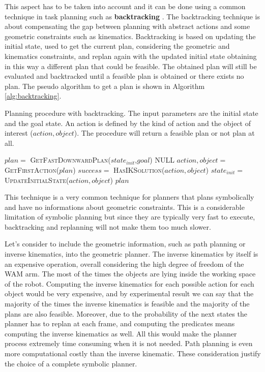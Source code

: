 This aspect has to be taken into account and it can be done using a common technique in task planning such as \textbf{backtracking} \citep{Bidot2015}. The backtracking technique is about compensating the gap between planning with abstract actions and some geometric constraints such as kinematics. Backtracking is based on updating the initial state, used to get the current plan, considering the geometric and kinematics constraints, and replan again with the updated initial state obtaining in this way a different plan that could be feasible. The obtained plan will still be evaluated and backtracked until a feasible plan is obtained or there exists no plan. The pseudo algorithm to get a plan is shown in Algorithm \ref{alg:backtracking}.

\begin{algorithm}
\caption{Planning procedure with backtracking. The input parameters are the initial state and the goal state. An action is defined by the kind of action and the object of interest ($action, object$). The procedure will return a feasible plan or not plan at all.}\label{alg:backtracking}
\begin{algorithmic}
\Repeat
  \State $plan =$ \textsc{GetFastDownwardPlan}($state_{init}$,$goal$)
  		\Return NULL 
  \EndIf
  \State $action, object =$ \textsc{GetFirstAction}($plan$)
  \State $success =$ \textsc{HasIKSolution}($action, object$) 
    \State $state_{init} =$ \textsc{UpdateInitialState}($action, object$) 
  \EndIf
{}
\Return $plan$
\EndProcedure
\end{algorithmic}
\end{algorithm}  

This technique is a very common technique for planners that plans symbolically and have no informations about geometric constraints. This is a considerable limitation of symbolic planning but since they are typically very fast to execute, backtracking and replanning will not make them too much slower.

Let's consider to include the geometric information, such as path planning or inverse kinematics, into the geometric planner. The inverse kinematics by itself is an expensive operation, overall considering the high degree of freedom of the WAM arm. The most of the times the objects are lying inside the working space of the robot. Computing the inverse kinematics for each possible action for each object would be very expensive, and by experimental result we can say that the majority of the times the inverse kinematics is feasible and the majority of the plans are also feasible. Moreover, due to the probability of the next states the planner has to replan at each frame, and computing the predicates means computing the inverse kinematics as well. All this would make the planner process extremely time consuming when it is not needed. Path planning is even more computational costly than the inverse kinematic. These consideration justify the choice of a complete symbolic planner.
  
